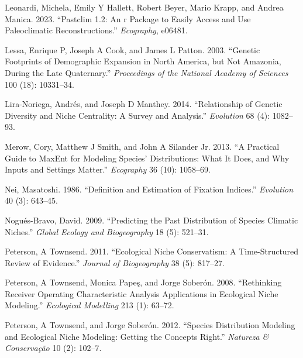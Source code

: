 \documentclass[
]{article}
\newlength{\cslhangindent}
\newlength{\cslentryspacingunit} %
\newenvironment{CSLReferences}[2] %
 {%
  \setlength{\parindent}{0pt}
  \ifodd #1
  \let\oldpar\par
  \def\par{\hangindent=\cslhangindent\oldpar}
  \fi
  \setlength{\parskip}{#2\cslentryspacingunit}
 }%
 {}
\begin{document}
\begin{CSLReferences}{1}{0}
\leavevmode{}%
Leonardi, Michela, Emily Y Hallett, Robert Beyer, Mario Krapp, and
Andrea Manica. 2023. {``Pastclim 1.2: An r Package to Easily Access and
Use Paleoclimatic Reconstructions.''} \emph{Ecography}, e06481.

\leavevmode{}%
Lessa, Enrique P, Joseph A Cook, and James L Patton. 2003. {``Genetic
Footprints of Demographic Expansion in North America, but Not Amazonia,
During the Late Quaternary.''} \emph{Proceedings of the National Academy
of Sciences} 100 (18): 10331--34.

\leavevmode{}%
Lira-Noriega, Andrés, and Joseph D Manthey. 2014. {``Relationship of
Genetic Diversity and Niche Centrality: A Survey and Analysis.''}
\emph{Evolution} 68 (4): 1082--93.

\leavevmode{}%
Merow, Cory, Matthew J Smith, and John A Silander Jr. 2013. {``A
Practical Guide to MaxEnt for Modeling Species' Distributions: What It
Does, and Why Inputs and Settings Matter.''} \emph{Ecography} 36 (10):
1058--69.

\leavevmode{}%
Nei, Masatoshi. 1986. {``Definition and Estimation of Fixation
Indices.''} \emph{Evolution} 40 (3): 643--45.

\leavevmode{}%
Nogués-Bravo, David. 2009. {``Predicting the Past Distribution of
Species Climatic Niches.''} \emph{Global Ecology and Biogeography} 18
(5): 521--31.

\leavevmode{}%
Peterson, A Townsend. 2011. {``Ecological Niche Conservatism: A
Time-Structured Review of Evidence.''} \emph{Journal of Biogeography} 38
(5): 817--27.

\leavevmode{}%
Peterson, A Townsend, Monica Papeş, and Jorge Soberón. 2008.
{``Rethinking Receiver Operating Characteristic Analysis Applications in
Ecological Niche Modeling.''} \emph{Ecological Modelling} 213 (1):
63--72.

\leavevmode{}%
Peterson, A Townsend, and Jorge Soberón. 2012. {``Species Distribution
Modeling and Ecological Niche Modeling: Getting the Concepts Right.''}
\emph{Natureza \& Conserva{ç}{ã}o} 10 (2): 102--7.


\end{CSLReferences}
\end{document}
